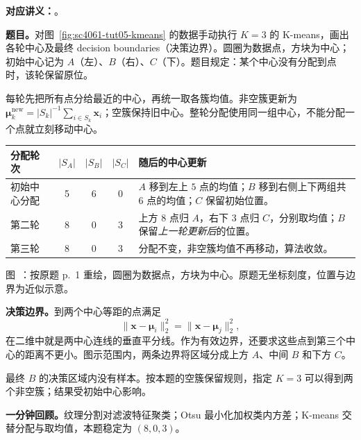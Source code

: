 
\textbf{对应讲义：}。
\par\nopagebreak[4]

\textbf{题目。}对图~\ref{fig:sc4061-tut05-kmeans} 的数据手动执行 $K=3$ 的 K-means，画出各轮中心及最终 decision boundaries（决策边界）。圆圈为数据点，方块为中心；初始中心记为 $A$（左）、$B$（右）、$C$（下）。题目规定：某个中心没有分配到点时，该轮保留原位。

\begin{checkedsolution}
每轮先把所有点分给最近的中心，再统一取各簇均值。非空簇更新为
$\bm\mu_k^{\mathrm{new}}=|S_k|^{-1}\sum_{i\in S_k}\mathbf x_i$；空簇保持旧中心。整轮分配使用同一组中心，不能分配一个点就立刻移动中心。

\begin{center}
\small
\begin{tabularx}{\textwidth}{@{}lcccX@{}}
\toprule
分配轮次 & $|S_A|$ & $|S_B|$ & $|S_C|$ & 随后的中心更新 \\
\midrule
初始中心分配 & 5 & 6 & 0 &
$A$ 移到左上 $5$ 点的均值；$B$ 移到右侧上下两组共 $6$ 点的均值；$C$ 保留初始位置。\\
第二轮 & 8 & 0 & 3 &
上方 $8$ 点归 $A$，右下 $3$ 点归 $C$，分别取均值；$B$ 保留\emph{上一轮更新后}的位置。\\
第三轮 & 8 & 0 & 3 &
分配不变，非空簇均值不再移动，算法收敛。\\
\bottomrule
\end{tabularx}
\end{center}

\begin{center}
  
  \par\smallskip
  \label{fig:sc4061-tut05-kmeans}
  {\small 图~\thefigure：按原题 p.~1 重绘，圆圈为数据点，方块为中心。原题无坐标刻度，位置与边界为近似示意。}
\end{center}

\textbf{决策边界。}到两个中心等距的点满足
\[
  \|\mathbf x-\bm\mu_i\|_2^2=\|\mathbf x-\bm\mu_j\|_2^2,
\]
在二维中就是两中心连线的垂直平分线。作为有效边界，还要求这些点到第三个中心的距离不更小。图示范围内，两条边界将区域分成上方 $A$、中间 $B$ 和下方 $C$。

最终 $B$ 的决策区域内没有样本。按本题的空簇保留规则，指定 $K=3$ 可以得到两个非空簇；结果受初始中心影响。
\end{checkedsolution}

\textbf{一分钟回顾。}纹理分割对滤波特征聚类；Otsu 最小化加权类内方差；K-means 交替分配与取均值，本题稳定为 $(8,0,3)$。

\endgroup
